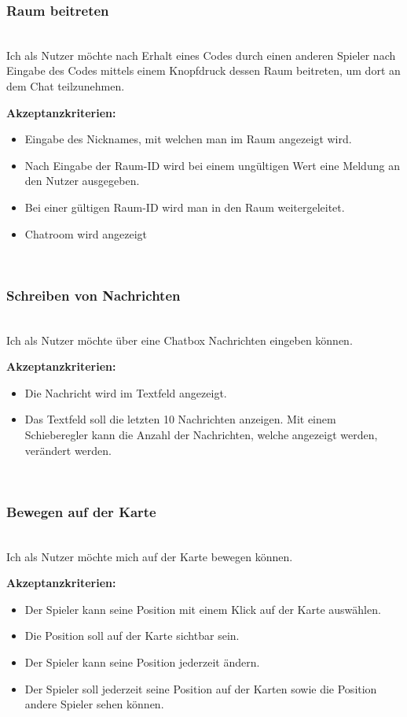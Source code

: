 \documentclass[conference]{IEEEtran}
\begin{document}
	\subsubsection{Raum beitreten}
	\ \\
	Ich als Nutzer möchte nach Erhalt eines Codes durch einen anderen Spieler nach Eingabe des Codes mittels einem Knopfdruck dessen Raum beitreten, um dort an dem Chat teilzunehmen.
	
	\textbf{Akzeptanzkriterien:}
	\begin{itemize}
		\item Eingabe des Nicknames, mit welchen man im Raum angezeigt wird.
		\item Nach Eingabe der Raum-ID  wird bei einem ungültigen Wert eine Meldung an den Nutzer ausgegeben.
		\item Bei einer gültigen Raum-ID wird man in den Raum weitergeleitet.
		\item Chatroom wird angezeigt
	\end{itemize}
	\ \\
	\subsubsection{Schreiben von Nachrichten}
	\ \\
	Ich als Nutzer möchte über eine Chatbox Nachrichten eingeben können.
	
	\textbf{Akzeptanzkriterien:}
	\begin{itemize}
		\item Die Nachricht wird im Textfeld angezeigt.
		\item Das Textfeld soll die letzten 10 Nachrichten anzeigen. Mit einem Schieberegler kann die Anzahl der Nachrichten, welche angezeigt werden, verändert werden.
	\end{itemize}
	
	\ \\
	\subsubsection{Bewegen auf der Karte}
	\ \\
	Ich als Nutzer möchte mich auf der Karte bewegen können.
	
	\textbf{Akzeptanzkriterien:}
	\begin{itemize}
		\item Der Spieler kann seine Position mit einem Klick auf der Karte auswählen.
		\item Die Position soll auf der Karte sichtbar sein.
		\item Der Spieler kann seine Position jederzeit ändern.
		\item Der Spieler soll jederzeit seine Position auf der Karten sowie die Position andere Spieler sehen können.
	\end{itemize}
	
\end{document}
